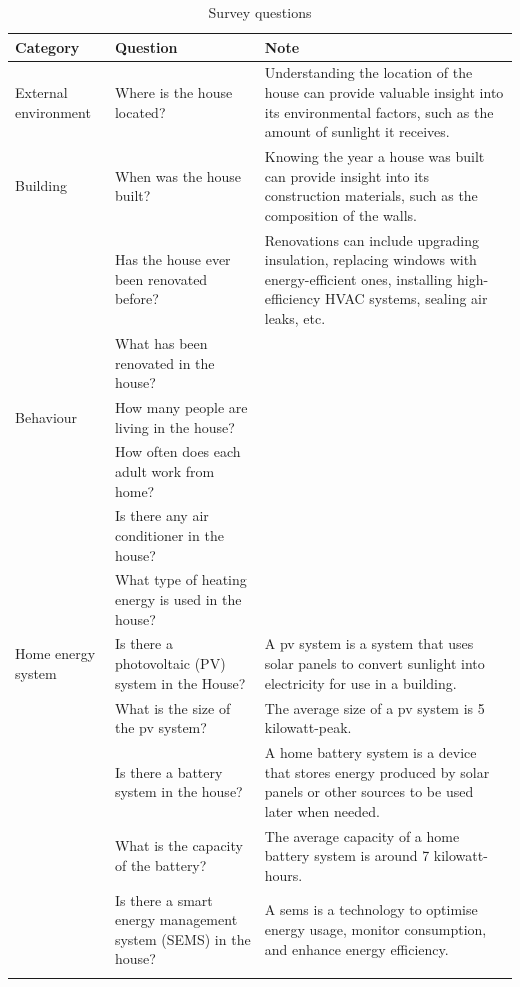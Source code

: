 \begin{center}
  \small
    \begin{longtable}{ | p{} | p{} | p{} | }
        \hline
        Category & Question & Note \\
        \hline
        External environment & Where is the house located? & Understanding the location of the house can provide valuable insight into its environmental factors, such as the amount of sunlight it receives. \\
        \hline
        Building & When was the house built? & Knowing the year a house was built can provide insight into its construction materials, such as the composition of the walls. \\
          & Has the house ever been renovated before? & Renovations can include upgrading insulation, replacing windows with energy-efficient ones, installing high-efficiency HVAC systems, sealing air leaks, etc. \\
          & What has been renovated in the house? &   \\
        \hline
        Behaviour & How many people are living in the house? &   \\
          & How often does each adult work from home? &   \\
          & Is there any air conditioner in the house? &   \\
          & What type of heating energy is used in the house? &   \\
        \hline
        Home energy system  & Is there a photovoltaic (PV) system in the House? & A \gls{pv} system is a system that uses solar panels to convert sunlight into electricity for use in a building. \\    
          & What is the size of the \gls{pv} system? & The average size of a \gls{pv} system is 5 kilowatt-peak. \\
          & Is there a battery system in the house? & A home battery system is a device that stores energy produced by solar panels or other sources to be used later when needed. \\
          & What is the capacity of the battery? & The average capacity of a home battery system is around 7 kilowatt-hours. \\
          & Is there a smart energy management system (SEMS) in the house? & A \gls{sems} is a technology to optimise energy usage, monitor consumption, and enhance energy efficiency. \\
        \hline
    \caption{Survey questions}
    \label{tab:questions}
    \end{longtable}
\end{center}

